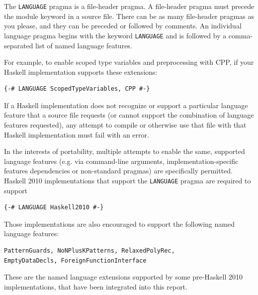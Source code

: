 \begin{haskellprime}

The \mbox{\tt LANGUAGE} pragma is a file-header pragma. A file-header pragma must
precede the module keyword in a source file. There can be as many
file-header pragmas as you please, and they can be preceded or
followed by comments. An individual language pragma begins with the
keyword \mbox{\tt LANGUAGE} and is followed by a comma-separated list of named
language features.

For example, to enable scoped type variables and preprocessing with
CPP, if your Haskell implementation supports these extensions:
\bprog
{\small\begin{verbatim}
{-# LANGUAGE ScopedTypeVariables, CPP #-}
\end{verbatim}}
\eprog
If a Haskell implementation does not recognize or support a particular
language feature that a source file requests (or cannot support the
combination of language features requested), any attempt to compile
or otherwise use that file with that Haskell implementation must fail
with an error.

In the interests of portability, multiple attempts to enable the same,
supported language features (e.g. via command-line arguments,
implementation-specific features dependencies or non-standard
pragmas) are specifically permitted.  Haskell 2010 implementations that
support the \mbox{\tt LANGUAGE} pragma are required to support
\bprog
{\small\begin{verbatim}
{-# LANGUAGE Haskell2010 #-}
\end{verbatim}}
\eprog
Those implementations are also encouraged to support the following
named language features:
\bprog
{\small\begin{verbatim}
PatternGuards, NoNPlusKPatterns, RelaxedPolyRec,
EmptyDataDecls, ForeignFunctionInterface
\end{verbatim}}
\eprog
These are the named language extensions supported by some pre-Haskell
2010 implementations, that have been integrated into this report.

\end{haskellprime}

